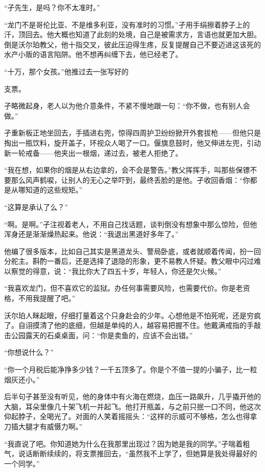 \documentclass{article}
\begin{document}
“孑先生，是吗？你不太准时。”

“龙门不是哥伦比亚、不是维多利亚，没有准时的习惯。”孑用手绢擦着脖子上的汗，顶回去。他大概也知道了此刻的处境，自己是被需求方，言语也就更加大胆。倒是沃尔珀教父，他十指交叉，彼此压迫得生疼，反复提醒自己不要迈进这该死的水产小贩的语言陷阱。他不想再纠缠下去，他已经老了。

“十万，那个女孩。”他推过去一张写好的

\newpage 

支票。

孑略微起身，老人以为他介意条件，不紧不慢地跟一句：“你不做，也有别人会做。”

孑重新板正地坐回去，手插进右兜，惊得四周护卫纷纷掀开外套拔枪——但他只是掏出一瓶饮料，旋开盖子，环视众人喝了一口。偃旗息鼓时，他又伸进左兜，引动新一轮戒备——他夹出一根烟，递过去，被老人拒绝了。

“我在想，如果你的烟是从右边拿的，会不会是警告。”教父挥挥手，叫那些保镖不要那么风声鹤唳，让别人的无心之举吓到，最终丢脸的是他。孑收回香烟：“你都是从哪知道的这些规矩。”

“这算是承认了么？”

“啊。是啊。”孑注视着老人，不用自己找话题，谈判倒没有想象中那么惊险，但他浑身还是渐渐燥热起来。他说：“我退出黑道好多年了。”

他编了很多版本，比如自己其实是黑道龙头、警局卧底，或者就顺着传闻，扮一回分舵主。斟酌一番后，还是选择了退隐的形象，更不易教人怀疑。教父眼中闪过难以察觉的得意，说：“我比你大了四五十岁，年轻人，你还是欠火候。”

\newpage 



“我喜欢龙门，但不喜欢它的监狱。办任何事需要风险，也需要代价。你是老资格，不用我提醒了吧。”

沃尔珀人眯起眼，仔细打量着这个只身赴会的少年。心想他是不怕死呢，还是穷疯了。自诩摸清了他的底细，但越是单纯的人，越容易把握不住。他戴满戒指的手敲击公园露天的石桌桌面，问：“你是卖鱼的，应该不会出错。”

“你想说什么？”

“你一个月税后能净挣多少钱？一千五顶多了。你是个不值一提的小骗子，比一粒烟灰还小。”

后半句孑甚至没有听见，他的身体中有火海在燃烧，血压一路飙升，几乎撬开他的大脑，耳朵里像几十架飞机一并起飞。他打开瓶盖，与之前只抿一口不同，他这次仰起脖子，全喝光了。对面的人笑着摇摇头：“这样的示威可不够格，怎么也得拿刀插大腿才有威慑力啊。”

“我直说了吧。你知道她为什么在我那里出现过？因为她是我的同学。”孑喘着粗气，说话断断续续的，将支票推回去，“虽然我不上学了，但她算是我处得最好的一个同学。”
\end{document}
